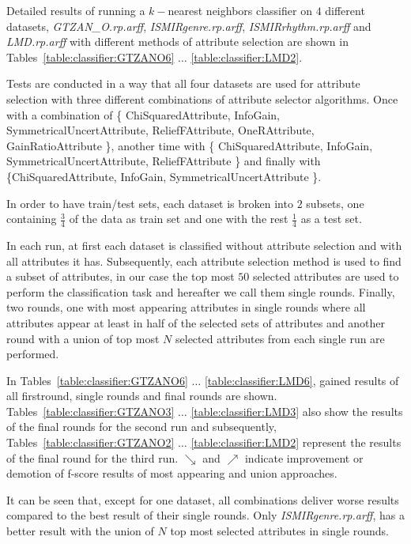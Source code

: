 Detailed results of running a $k-$nearest neighbors classifier on $4$ different
datasets, {\it GTZAN\_O.rp.arff}, {\it ISMIRgenre.rp.arff}, {\it
ISMIRrhythm.rp.arff} and {\it LMD.rp.arff} with different methods of attribute
selection are shown in Tables~\ref{table:classifier:GTZANO6} $\ldots$ \ref{table:classifier:LMD2}.

Tests are conducted in a way that all four datasets are used for attribute
selection with three different combinations of attribute selector algorithms.
Once with a combination of \{ ChiSquaredAttribute, InfoGain,
SymmetricalUncertAttribute, ReliefFAttribute, OneRAttribute, GainRatioAttribute
\}, another time with \{ ChiSquaredAttribute, InfoGain,
SymmetricalUncertAttribute, ReliefFAttribute \} and finally with \{ChiSquaredAttribute, InfoGain,
SymmetricalUncertAttribute \}. 

In order to have train/test sets, each dataset is broken into $2$ subsets, one
containing $\frac{3}{4}$ of the data as train set and one with the rest
$\frac{1}{4}$ as a test set.

In each run, at first each dataset is classified
without attribute selection and with all attributes it has. Subsequently, each
attribute selection method is used to find a subset of attributes, in our
case the top most $50$ selected attributes are used to perform the
classification task and hereafter we call them single rounds. Finally, two
rounds, one with most appearing attributes in single rounds where all
attributes appear at least in half of the selected sets of attributes and another round with a union of top most $N$ selected attributes
from each single run are performed.

In Tables~\ref{table:classifier:GTZANO6} $\ldots$
\ref{table:classifier:LMD6}, gained results of all firstround, single rounds and
final rounds are shown. Tables~\ref{table:classifier:GTZANO3} $\ldots$
\ref{table:classifier:LMD3} also show the results of the final rounds for the
second run and subsequently, Tables~\ref{table:classifier:GTZANO2} $\ldots$
\ref{table:classifier:LMD2} represent the results of the final round for the
third run. $\searrow$ and $\nearrow$ indicate improvement or demotion of f-score
results of most appearing and union approaches.

It can be seen that, except for one dataset, all combinations deliver worse results compared to the best result of their single rounds. Only {\it ISMIRgenre.rp.arff}, has a better result with the union of $N$ top most selected attributes in
single rounds.


